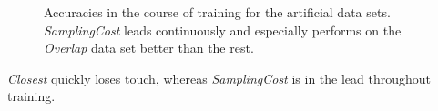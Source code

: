 \documentclass[conference]{IEEEtran}
\begin{document}
\begin{figure}
        \centering
        \caption{Accuracies in the course of training for the artificial data sets. 
        \textit{SamplingCost} leads continuously and especially performs on the \textit{Overlap} data set better than the rest.}
        \label{fig:Toy1Graphs}
\end{figure}
\textit{Closest} quickly loses touch, whereas \textit{SamplingCost} is in the lead throughout training. 
 
\end{document}
